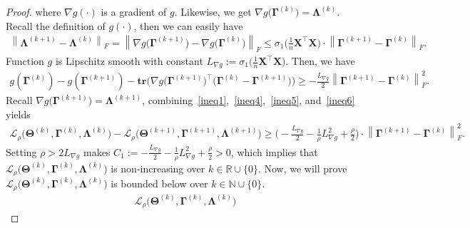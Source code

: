 \documentclass[alpha-refs]{wiley-article}
\begin{document}
\begin{proof}
where $\nabla g (\cdot)$ is a gradient of $g$.
Likewise, we get $\nabla g\big( \boldsymbol{\Gamma}^{(k)} \big) = \boldsymbol{\Lambda}^{(k)}$.
Recall the definition of $g(\cdot)$, then we can easily have
\begin{align} \label{ineq5}
    \left\|\boldsymbol{\Lambda}^{(k+1)}-\boldsymbol{\Lambda}^{(k)}\right\|_{F} =
    \left\|\nabla g\big( \boldsymbol{\Gamma}^{(k+1)} \big)
    - \nabla g\big( \boldsymbol{\Gamma}^{(k)} \big)\right\|_{F}
    \leq \sigma_{1}\bigg( \frac{1}{n}\boldsymbol{X}^{\top}\boldsymbol{X}\bigg)
    \cdot 
    \left\| \boldsymbol{\Gamma}^{(k+1)} - \boldsymbol{\Gamma}^{(k)} \right\|_{F}.
\end{align}
Function $g$ is Lipschitz smooth with constant $L_{\nabla g}:=\sigma_{1}\bigg( \frac{1}{n}\boldsymbol{X}^{\top}\boldsymbol{X}\bigg)$.
Then, we have 
\begin{align} \label{ineq6}
    g(\boldsymbol{\Gamma}^{(k)}) - g(\boldsymbol{\Gamma}^{(k+1)})
    - \textbf{tr}\bigg(\nabla g\big(\boldsymbol{\Gamma}^{(k+1)}\big)^\top
    \big(\boldsymbol{\Gamma}^{(k)}-\boldsymbol{\Gamma}^{(k+1)}\big)\bigg) \geq -\frac{L_{\nabla g}}{2}
    \left\| \boldsymbol{\Gamma}^{(k+1)} - \boldsymbol{\Gamma}^{(k)} \right\|_{F}^{2}.
\end{align}
Recall $\nabla g\big( \boldsymbol{\Gamma}^{(k+1)} \big) = \boldsymbol{\Lambda}^{(k+1)}$, combining~\eqref{ineq1},~\eqref{ineq4},~\eqref{ineq5}, and~\eqref{ineq6} yields 
\begin{align*}
    \mathcal{L}_{\rho} \big( \boldsymbol{\Theta}^{(k)},\boldsymbol{\Gamma}^{(k)},\boldsymbol{\Lambda}^{(k)} \big) 
    - \mathcal{L}_{\rho} \big( \boldsymbol{\Theta}^{(k+1)},\boldsymbol{\Gamma}^{(k+1)},\boldsymbol{\Lambda}^{(k+1)} \big)
    \geq \bigg(  -\frac{L_{\nabla g}}{2} -\frac{1}{\rho} L_{\nabla g}^{2} + \frac{\rho}{2} \bigg) \cdot 
    \left\| \boldsymbol{\Gamma}^{(k+1)} - \boldsymbol{\Gamma}^{(k)} \right\|_{F}^{2}.
\end{align*}
Setting $\rho>2L_{\nabla g}$ makes $C_{1}:=-\frac{L_{\nabla g}}{2} -\frac{1}{\rho} L_{\nabla g}^{2} + \frac{\rho}{2}>0$, which implies that $\mathcal{L}_{\rho}\big( \boldsymbol{\Theta}^{(k)},\boldsymbol{\Gamma}^{(k)},\boldsymbol{\Lambda}^{(k)} \big)$ is non-increasing over $k\in\mathbb{R}\cup \{0\}$.
Now, we will prove $ \mathcal{L}_{\rho}\big(\boldsymbol{\Theta}^{(k)},\boldsymbol{\Gamma}^{(k)},\boldsymbol{\Lambda}^{(k)}\big)$ is bounded below over $k\in\mathbb{N}\cup\{0\}$.
\begin{align*}
    \mathcal{L}_{\rho}\big(\boldsymbol{\Theta}^{(k)},\boldsymbol{\Gamma}^{(k)},\boldsymbol{\Lambda}^{(k)}\big)

\end{align*}
\end{proof}
\end{document}
